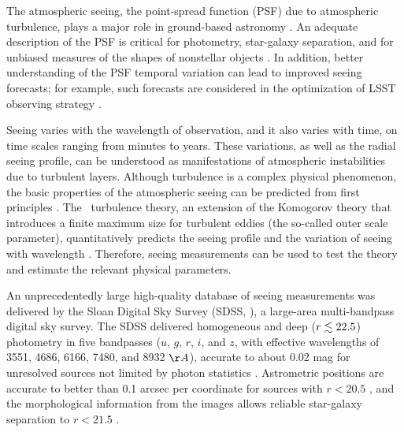 

The atmospheric seeing, the point-spread function (PSF) due to atmospheric turbulence, plays
a major role in ground-based astronomy \citep{Roddier1981}. An adequate description 
of the PSF is critical for photometry, star-galaxy separation, and for unbiased measures of 
the shapes of nonstellar objects \citep{Lupton2001}. In addition, better understanding of the 
PSF temporal variation can lead to improved seeing forecasts; for example, such forecasts are 
considered in the optimization of LSST observing strategy \citep{LSSToverview}.

Seeing varies with the wavelength of observation, and it also varies with time, on time 
scales ranging from minutes to years. These variations, as well as the radial seeing
profile, can be understood as manifestations of atmospheric instabilities due to turbulent layers. 
Although turbulence is a complex physical phenomenon, the basic properties of the atmospheric
seeing can be predicted from first principles \citep{Racine2009}. The
\vk~turbulence theory, 
an extension of the Komogorov theory that introduces a finite maximum 
size for turbulent eddies (the so-called
outer scale parameter), quantitatively predicts the seeing profile and the variation of seeing
with wavelength \citep{vk1, vk2}. Therefore, seeing measurements can be used to test the theory and estimate
the relevant physical parameters. 

An unprecedentedly large high-quality database of seeing measurements was delivered by the Sloan Digital Sky Survey (SDSS, \citealt{York2000}), a large-area multi-bandpass digital sky survey. The SDSS delivered homogeneous and deep 
($r\lesssim22.5$) photometry in five bandpasses ($u$, $g$, $r$, $i$, and $z$, with effective wavelengths 
of 3551, 4686, 6166, 7480, and 8932 $\AA$), accurate to about 0.02 mag for unresolved sources 
not limited by photon statistics \citep{Sesar2007}. Astrometric positions are accurate to better 
than 0.1 arcsec per coordinate for sources with $r<20.5$ \citep{Pier2003}, and the morphological 
information from the images allows reliable star-galaxy separation to $r<21.5$ \citep{Lupton2002}.
 
